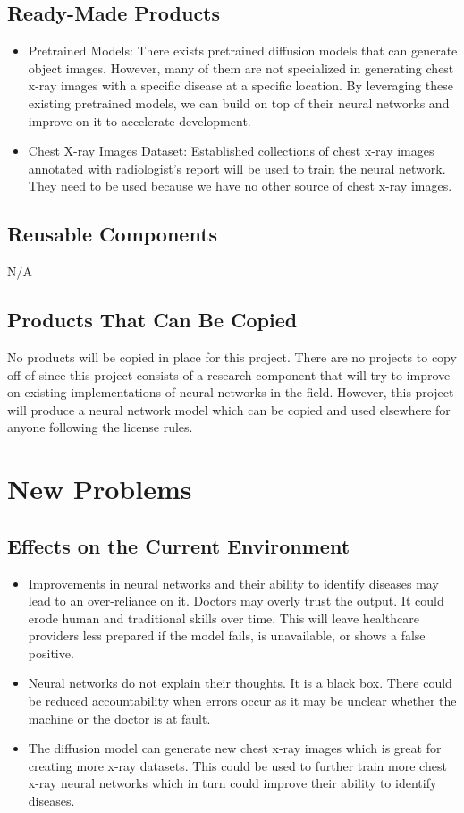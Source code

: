 \documentclass[12pt]{article}
\begin{document}
\subsection{Ready-Made Products}
\begin{itemize}
    \item Pretrained Models: There exists pretrained diffusion models that can generate object 
    images. However, many of them are not specialized in generating chest x-ray images with a 
    specific disease at a specific location. By leveraging these existing pretrained models, we 
    can build on top of their neural networks and improve on it to accelerate development.
    \item Chest X-ray Images Dataset: Established collections of chest x-ray images annotated with 
    radiologist’s report will be used to train the neural network. They need to be used because we 
    have no other source of chest x-ray images.
\end{itemize}
\subsection{Reusable Components}
N/A 

\subsection{Products That Can Be Copied}
No products will be copied in place for this project. There are no projects to copy off of since 
this project consists of a research component that will try to improve on existing implementations 
of neural networks in the field. However, this project will produce a neural network model which 
can be copied and used elsewhere for anyone following the license rules.


\section{New Problems}
\subsection{Effects on the Current Environment}
\begin{itemize}
    \item Improvements in neural networks and their ability to identify diseases may lead to an 
    over-reliance on it. Doctors may overly trust the output. It could erode human and traditional 
    skills over time. This will leave healthcare providers less prepared if the model fails, is 
    unavailable, or shows a false positive.
    \item Neural networks do not explain their thoughts. It is a black box. There could be reduced 
    accountability when errors occur as it may be unclear whether the machine or the doctor is at 
    fault.
    \item The diffusion model can generate new chest x-ray images which is great for creating more 
    x-ray datasets. This could be used to further train more chest x-ray neural networks which in 
    turn could improve their ability to identify diseases.
\end{itemize}
\end{document}
